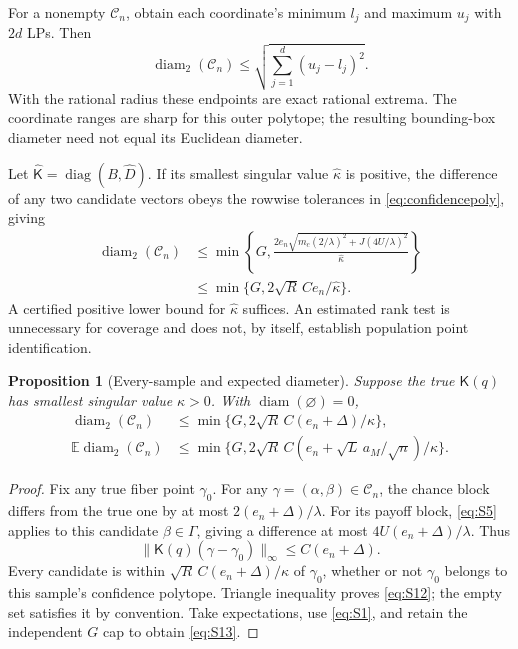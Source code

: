 \documentclass[11pt,a4paper]{article}
\numberwithin{equation}{section}
\newtheorem{proposition}[theorem]{Proposition}
\theoremstyle{definition}
\newcommand{\E}{\mathbb E}
\DeclareMathOperator{\diag}{diag}
\DeclareMathOperator{\diam}{diam}
\begin{document}
For a nonempty \(\mathcal C_n\), obtain each coordinate's minimum
\(l_j\) and maximum \(u_j\) with \(2d\) LPs. Then
\[
 \diam_2(\mathcal C_n)\le
             \sqrt{\sum_{j=1}^d(u_j-l_j)^2}.
\]
With the rational radius these endpoints are exact rational extrema.
The coordinate ranges are sharp for this outer polytope; the resulting
bounding-box diameter need not equal its Euclidean diameter.

Let \(\widehat{\mathsf K}=\diag(B,\widehat D)\).
If its smallest singular value \(\widehat\kappa\) is positive,
the difference of any two candidate vectors obeys the rowwise
tolerances in \eqref{eq:confidencepoly}, giving
\begin{equation}\label{eq:S11}
 \begin{split}
 \diam_2(\mathcal C_n)
 &\le\min\left\{G,
  \frac{2e_n\sqrt{m_c(2/\lambda)^2+J(4U/\lambda)^2}}
       {\widehat\kappa}\right\}\\
 &\le\min\{G,2\sqrt R\,Ce_n/\widehat\kappa\}.
 \end{split}
\end{equation}
A certified positive lower bound for \(\widehat\kappa\) suffices.
An estimated rank test is unnecessary for coverage and does not,
by itself, establish population point identification.

\begin{proposition}[Every-sample and expected diameter]
\label{prop:diameter}
Suppose the true \(\mathsf K(q)\) has smallest singular value
\(\kappa>0\). With \(\diam(\varnothing)=0\),
\begin{align}
 \diam_2(\mathcal C_n)
  &\le\min\{G,2\sqrt R\,C(e_n+\Delta)/\kappa\},
                                      \label{eq:S12}\\
 \E\diam_2(\mathcal C_n)
  &\le\min\{G,2\sqrt R\,C(e_n+\sqrt L\,a_M/\sqrt n)/\kappa\}.
                                      \label{eq:S13}
\end{align}
\end{proposition}
\begin{proof}
Fix any true fiber point \(\gamma_0\). For any
\(\gamma=(\alpha,\beta)\in\mathcal C_n\), the chance block differs
from the true one by at most \(2(e_n+\Delta)/\lambda\).
For its payoff block, \eqref{eq:S5} applies to this candidate
\(\beta\in\Gamma\), giving a difference at most
\(4U(e_n+\Delta)/\lambda\). Thus
\[
 \|\mathsf K(q)(\gamma-\gamma_0)\|_\infty
                    \le C(e_n+\Delta).
\]
Every candidate is within
\(\sqrt R\,C(e_n+\Delta)/\kappa\) of \(\gamma_0\), whether or not
\(\gamma_0\) belongs to this sample's confidence polytope.
Triangle inequality proves \eqref{eq:S12}; the empty set satisfies
it by convention. Take expectations, use \eqref{eq:S1}, and retain
the independent \(G\) cap to obtain \eqref{eq:S13}.
\end{proof}
\end{document}
